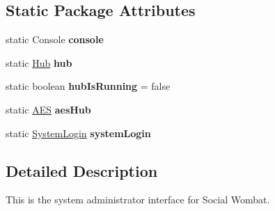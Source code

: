 \subsection*{\-Static \-Package \-Attributes}
\begin{DoxyCompactItemize}
\item 
\hypertarget{classhub_1_1_sys_admin_interface_a9580850a1791e190f41261c5d63e8276}{
static \-Console {\bfseries console}}
\label{classhub_1_1_sys_admin_interface_a9580850a1791e190f41261c5d63e8276}

\item 
\hypertarget{classhub_1_1_sys_admin_interface_ad6dfbbe50d20138e3440c77d05d5492f}{
static \hyperlink{classhub_1_1_hub}{\-Hub} {\bfseries hub}}
\label{classhub_1_1_sys_admin_interface_ad6dfbbe50d20138e3440c77d05d5492f}

\item 
\hypertarget{classhub_1_1_sys_admin_interface_a287aa7d3c81e858985045b86ae74293b}{
static boolean {\bfseries hub\-Is\-Running} = false}
\label{classhub_1_1_sys_admin_interface_a287aa7d3c81e858985045b86ae74293b}

\item 
\hypertarget{classhub_1_1_sys_admin_interface_a54d91b3172b64ab71046a66938cb0c06}{
static \hyperlink{classsecurity_1_1_a_e_s}{\-A\-E\-S} {\bfseries aes\-Hub}}
\label{classhub_1_1_sys_admin_interface_a54d91b3172b64ab71046a66938cb0c06}

\item 
\hypertarget{classhub_1_1_sys_admin_interface_afb0003f76ff78f3be3e438cb8a7c8b1d}{
static \hyperlink{classhub_1_1_system_login}{\-System\-Login} {\bfseries system\-Login}}
\label{classhub_1_1_sys_admin_interface_afb0003f76ff78f3be3e438cb8a7c8b1d}

\end{DoxyCompactItemize}


\subsection{\-Detailed \-Description}
\-This is the system administrator interface for \-Social \-Wombat. 

